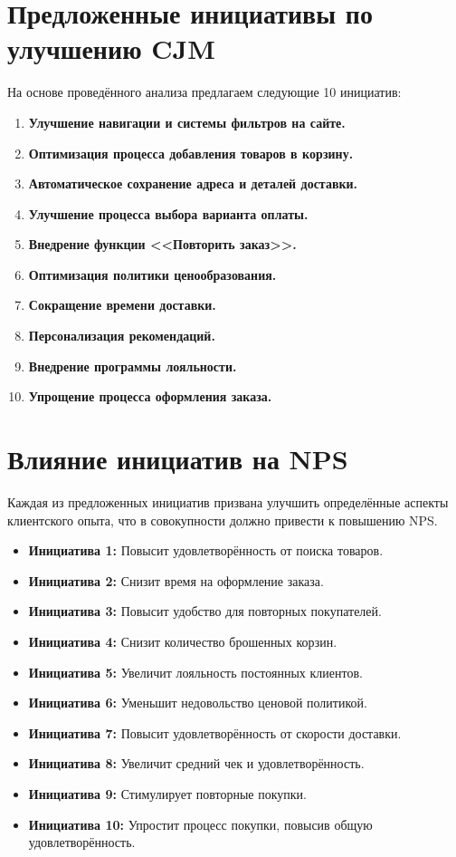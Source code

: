 \documentclass[a4paper,12pt]{article}
\begin{document}
\section{Предложенные инициативы по улучшению CJM}

На основе проведённого анализа предлагаем следующие 10 инициатив:

\begin{enumerate}
  \item \textbf{Улучшение навигации и системы фильтров на сайте.}
  \item \textbf{Оптимизация процесса добавления товаров в корзину.}
  \item \textbf{Автоматическое сохранение адреса и деталей доставки.}
  \item \textbf{Улучшение процесса выбора варианта оплаты.}
  \item \textbf{Внедрение функции <<Повторить заказ>>.}
  \item \textbf{Оптимизация политики ценообразования.}
  \item \textbf{Сокращение времени доставки.}
  \item \textbf{Персонализация рекомендаций.}
  \item \textbf{Внедрение программы лояльности.}
  \item \textbf{Упрощение процесса оформления заказа.}
\end{enumerate}

\section{Влияние инициатив на NPS}

Каждая из предложенных инициатив призвана улучшить определённые аспекты клиентского опыта, что в совокупности должно привести к повышению NPS.

\begin{itemize}
  \item \textbf{Инициатива 1:} Повысит удовлетворённость от поиска товаров.
  \item \textbf{Инициатива 2:} Снизит время на оформление заказа.
  \item \textbf{Инициатива 3:} Повысит удобство для повторных покупателей.
  \item \textbf{Инициатива 4:} Снизит количество брошенных корзин.
  \item \textbf{Инициатива 5:} Увеличит лояльность постоянных клиентов.
  \item \textbf{Инициатива 6:} Уменьшит недовольство ценовой политикой.
  \item \textbf{Инициатива 7:} Повысит удовлетворённость от скорости доставки.
  \item \textbf{Инициатива 8:} Увеличит средний чек и удовлетворённость.
  \item \textbf{Инициатива 9:} Стимулирует повторные покупки.
  \item \textbf{Инициатива 10:} Упростит процесс покупки, повысив общую удовлетворённость.
\end{itemize}
\end{document}
